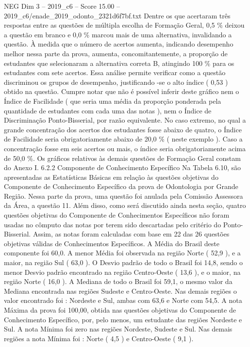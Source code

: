 \begin{textsample}{NEG Dim 3 – 2019\_c6 – Score 15.00 – 2019\_c6/enade\_2019\_odonto\_2321d6f7bf.txt}
Dentre os que acertaram três respostas entre as questões de múltipla escolha de Formação Geral, 0,5 \% deixou a questão em branco e 0,0 \% marcou mais de uma alternativa, invalidando a questão.
À medida que o número de acertos aumenta, indicando desempenho melhor nessa parte da prova, aumenta, concomitantemente, a proporção de estudantes que selecionaram a alternativa correta B, atingindo 100 \% para os estudantes com sete acertos.
Essa análise permite verificar como a questão discriminou os grupos de desempenho, justificando -se o alto índice ( 0,53 ) obtido na questão.
Cumpre notar que não é possível inferir deste gráfico nem o Índice de Facilidade ( que seria uma média da proporção ponderada pela quantidade de estudantes com cada uma das notas ), nem o Índice de Discriminação Ponto-Bisserial, por razão equivalente.
No caso extremo, no qual a grande concentração dos acertos dos estudantes fosse abaixo de quatro, o Índice de Facilidade seria obrigatoriamente abaixo de 20,0 \% ( neste exemplo ).
Caso a concentração fosse em seis acertos ou mais, o índice seria obrigatoriamente acima de 50,0 \%.
Os gráficos relativos às demais questões de Formação Geral constam do Anexo I. 6.2.2 Componente de Conhecimento Específico Na Tabela 6.10, são apresentadas as Estatísticas Básicas em relação às questões objetivas do Componente de Conhecimento Específico da prova de Odontologia por Grande Região.
Nessa parte da prova, uma questão foi anulada pela Comissão Assessora da Área, a questão 11.
Além disso, como será discutido ainda nesta seção, quatro questões objetivas do Componente de Conhecimentos Específicos não foram usadas no cômputo das notas por terem sido descartadas pelo critério do Ponto-Bisserial.
Assim, as notas foram calculadas com base em 22 das 26 questões objetivas válidas de Conhecimentos Específicos.
A Média do Brasil deste componente foi 60,0.
A menor Média foi observada na região Norte ( 52,9 ), e a maior, na região Sul ( 63,0 ).
O Desvio padrão de todo o Brasil foi 14,8, sendo o menor Desvio padrão encontrado na região Centro-Oeste ( 13,6 ), e o maior, na região Norte ( 16,0 ).
A Mediana de todo o Brasil foi 59,1, o mesmo valor da Mediana encontrada nas regiões Sudeste e Centro-Oeste.
Nas demais regiões o valor encontrado foi : Nordeste e Sul, ambas com 63,6 e Norte com 54,5.
A nota Máxima da prova foi 100,00, obtida nas questões objetivas do Componente de Conhecimento Específico, por, pelo menos, um estudante das regiões Nordeste e Sul.
A nota Mínima foi zero nas regiões Nordeste, Sudeste e Sul.
Nas demais regiões a nota Mínima foi : Norte ( 4,5 ) e Centro-Oeste ( 9,1 ).

\end{textsample}
